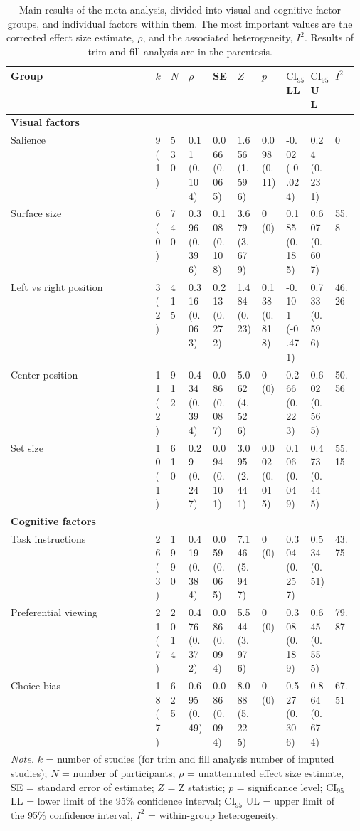\begin{table}[ht]
\centering
\caption{Main results of the meta-analysis, divided into visual and cognitive factor groups, and individual factors within them. The most important values are the corrected effect size estimate, $\rho$, and the associated heterogeneity, $I^2$. Results of trim and fill analysis are in the parentesis.} 
\label{tab:main_results}
\begingroup\small
\begin{tabular}{lp{0.03\linewidth}p{0.05\linewidth}p{0.07\linewidth}p{0.07\linewidth}p{0.07\linewidth}p{0.07\linewidth}p{0.07\linewidth}p{0.07\linewidth}p{0.07\linewidth}}
  \hline
Group & $k$ & $N$ & $\rho$ & SE & $Z$ & $p$ & $\textrm{CI}_{95}$ LL & $\textrm{CI}_{95}$ UL & $I^2$ \\ 
  \hline
\textbf{Visual factors} &  &  &  &  &  &  &  &  &  \\ 
  Salience & 9 (1) & 530 & 0.11 (0.104) & 0.066 (0.065) & 1.656 (1.596) & 0.098 (0.11) & -0.02 (-0.024) & 0.24 (0.231) & 0 \\ 
  Surface size & 6 (0) & 740 & 0.396 (0.396) & 0.108 (0.108) & 3.679 (3.679) & 0 (0) & 0.185 (0.185) & 0.607 (0.607) & 55.8 \\ 
  Left vs right position & 3 (2) & 415 & 0.316 (0.063) & 0.213 (0.272) & 1.484 (0.23) & 0.138 (0.818) & -0.101 (-0.471) & 0.733 (0.596) & 46.26 \\ 
  Center position & 11 (2) & 912 & 0.434 (0.394) & 0.086 (0.087) & 5.062 (4.526) & 0 (0) & 0.266 (0.223) & 0.602 (0.565) & 50.56 \\ 
  Set size & 10 (1) & 610 & 0.29 (0.247) & 0.094 (0.101) & 3.095 (2.441) & 0.002 (0.015) & 0.106 (0.049) & 0.473 (0.445) & 55.15 \\ 
  \textbf{Cognitive factors} &  &  &  &  &  &  &  &  &  \\ 
  Task instructions & 26 (3) & 1990 & 0.419 (0.384) & 0.059 (0.065) & 7.146 (5.947) & 0 (0) & 0.304 (0.257) & 0.534 (0.51) & 43.75 \\ 
  Preferential viewing & 21 (7) & 2014 & 0.476 (0.372) & 0.086 (0.094) & 5.544 (3.976) & 0 (0) & 0.308 (0.189) & 0.645 (0.555) & 79.87 \\ 
  Choice bias & 18 (7) & 625 & 0.695 (0.49) & 0.086 (0.094) & 8.088 (5.225) & 0 (0) & 0.527 (0.306) & 0.864 (0.674) & 67.51 \\ 
   \hline 
 \multicolumn{10}{p{0.9\textwidth}}{\scriptsize{\textit{Note.} $k$ = number of studies (for trim and fill analysis number of imputed studies); $N$ = number of participants; $\rho$ = unattenuated effect size estimate, SE = standard error of estimate; $Z$ = Z statistic; $p$ = significance level; $\textrm{CI}_{95}$ LL = lower limit of the 95\% confidence interval; $\textrm{CI}_{95}$ UL = upper limit of the 95\% confidence interval, $I^2$ = within-group heterogeneity.}} 
\end{tabular}
\endgroup
\end{table}
